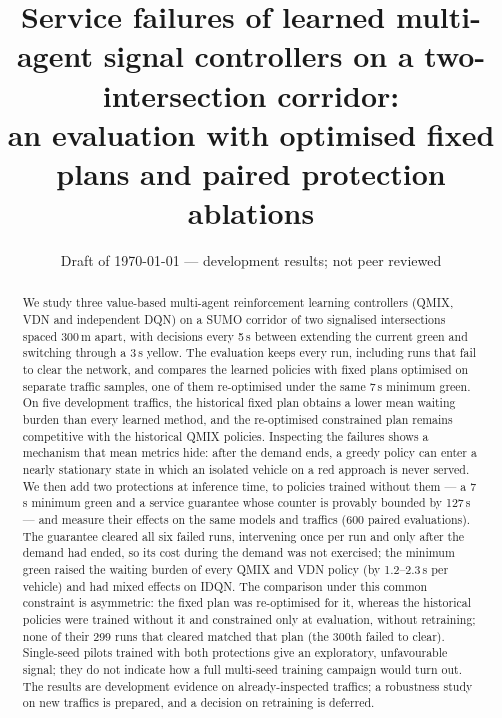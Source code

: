 \documentclass[11pt]{article}
\title{Service failures of learned multi-agent signal controllers on a two-intersection corridor:\\
an evaluation with optimised fixed plans and paired protection ablations}
\author{\tocomplete{authors and affiliations}}
\date{Draft of \today{} --- development results; not peer reviewed}
\begin{document}
\maketitle

\begin{abstract}
We study three value-based multi-agent reinforcement learning controllers (QMIX, VDN and independent DQN)
on a SUMO corridor of two signalised intersections spaced 300\,m apart, with decisions every 5\,s between
extending the current green and switching through a 3\,s yellow. The evaluation keeps every run, including
runs that fail to clear the network, and compares the learned policies with fixed plans optimised on
separate traffic samples, one of them re-optimised under the same 7\,s minimum green. On five development
traffics, the historical fixed plan obtains a lower mean waiting burden than every learned method, and the
re-optimised constrained plan remains competitive with the historical QMIX policies. Inspecting the
failures shows a mechanism that mean metrics hide: after the demand ends, a greedy policy can enter a
nearly stationary state in which an isolated vehicle on a red approach is never served. We then add two
protections at inference time, to policies trained without them --- a 7\,s minimum green and a service guarantee whose counter is provably
bounded by 127\,s --- and measure their effects on the same models and traffics (600 paired evaluations).
The guarantee cleared all six failed runs, intervening once per run and only after the demand had ended,
so its cost during the demand was not exercised; the minimum green raised the waiting burden of every QMIX
and VDN policy (by 1.2--2.3\,s per vehicle) and had mixed effects on IDQN. The comparison under this common
constraint is asymmetric: the fixed plan was re-optimised for it, whereas the historical policies were trained
without it and constrained only at evaluation, without retraining; none of their 299 runs that cleared matched
that plan (the 300th failed to clear). Single-seed pilots trained with both protections give an exploratory,
unfavourable signal; they do not indicate how a full multi-seed training campaign would turn out. The results
are development evidence on already-inspected traffics; a robustness study on new traffics is prepared, and a
decision on retraining is deferred.
\end{abstract}
\end{document}
